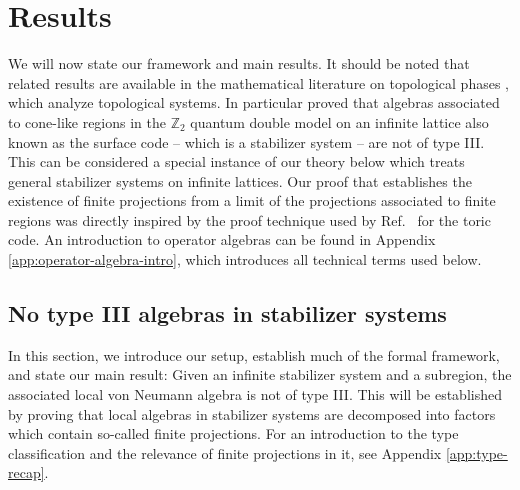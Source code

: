 \documentclass[aps,pra,reprint,superscriptaddress]{revtex4-2}
\theoremstyle{definition}
\theoremstyle{remark}
\begin{document}
\section{Results}
\label{sec:results}
We will now state our framework and main results. It should be noted that related results are available in the 
mathematical literature on topological phases \cite{Ogata:2022qdm,Jones:2023xew}, which analyze topological systems. In particular \cite{Ogata:2022qdm} proved that algebras associated to cone-like regions in the $\mathbb{Z}_2$ quantum double model on an infinite lattice also known as the surface code -- which is a stabilizer system -- are not of type III. This can be considered a special instance of our theory below which treats general stabilizer systems on infinite lattices. Our proof that establishes the existence of finite projections from a limit of the projections associated to finite regions was directly inspired by the proof technique used by 
Ref.~\cite{Ogata:2022qdm} for the toric code. An introduction to operator algebras can be found in Appendix \ref{app:operator-algebra-intro}, which introduces all technical terms used 
below.

\subsection{No type III algebras in stabilizer systems}\label{sec:main-thm}

In this section, we introduce our setup, establish much of the formal framework, and state our main result: Given an infinite stabilizer system
and a subregion, the associated local von Neumann algebra is not of type III. This will be established by proving that local algebras in stabilizer systems are decomposed into factors which contain so-called finite projections. For an introduction to the type classification and the relevance of finite projections in it, see Appendix \ref{app:type-recap}. 
\end{document}
